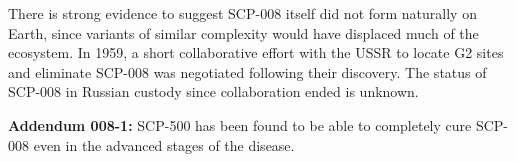 There is strong evidence to suggest SCP-008 itself did not form naturally on Earth, since variants of similar complexity would have displaced much of the ecosystem. In 1959, a short collaborative effort with the USSR to locate G2 sites and eliminate SCP-008 was negotiated following their discovery. The status of SCP-008 in Russian custody since collaboration ended is unknown.

\textbf{Addendum 008-1:} SCP-500 has been found to be able to completely cure SCP-008 even in the advanced stages of the disease.